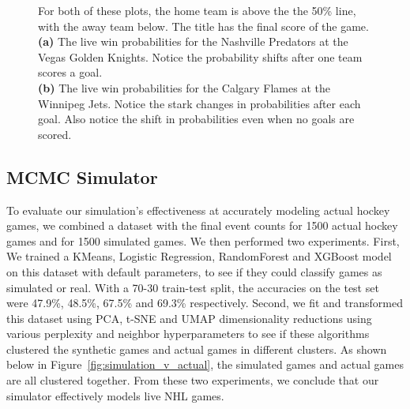 \documentclass[11pt]{article}
\begin{document}
\begin{figure}
    \centering
    \caption{For both of these plots, the home team is above the the 50\% line, with the
    away team below. The title has the final score of the game. \\
        \textbf{(a)} The live win probabilities for the Nashville Predators at the Vegas Golden Knights. 
    Notice the probability shifts after one team scores a goal.  \\
        \textbf{(b)} The live win probabilities for the Calgary Flames at the Winnipeg Jets.
        Notice the stark changes in probabilities after each goal. Also notice the
        shift in probabilities even when no goals are scored.}
    \label{fig:xgboost_res}
\end{figure}

\subsection{MCMC Simulator}

To evaluate our simulation's effectiveness at accurately modeling actual hockey 
games, we combined a dataset with the final event counts for 1500 actual hockey 
games and for 1500 simulated games. We then performed two experiments. First, We 
trained a KMeans, Logistic Regression, RandomForest and XGBoost model on this 
dataset with default parameters, to see 
if they could classify games as simulated or real. With a 70-30 train-test split, 
the accuracies on the test set were 47.9\%, 48.5\%, 67.5\% and 69.3\% respectively. 
Second, we fit and transformed this dataset using PCA, t-SNE and UMAP 
dimensionality reductions using various perplexity and neighbor hyperparameters to see 
if these algorithms clustered the synthetic games and actual games in 
different clusters. As shown below in Figure~\ref{fig:simulation_v_actual}, the simulated
games and actual games are all clustered together. From these two experiments, we conclude
that our simulator effectively models live NHL games.
\end{document}

